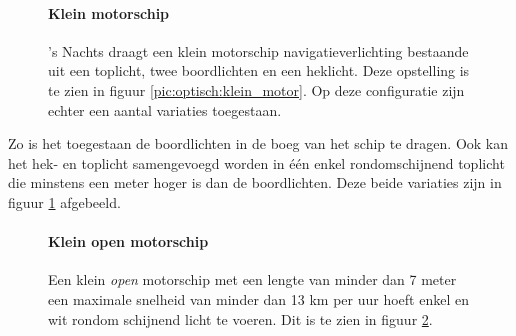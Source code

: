 \begin{figure}[H]
	\centering
	\begin{minipage}[t]{0.50\textwidth}
		\paragraph{Klein motorschip}
		's Nachts draagt een klein motorschip navigatieverlichting bestaande uit een toplicht, twee boordlichten en een heklicht. Deze opstelling is te zien in figuur \ref{pic:optisch:klein_motor}. Op deze configuratie zijn echter een aantal variaties toegestaan.		
	\end{minipage}
	\hfill
	\begin{minipage}[t]{0.22\textwidth}
		\RemoveLine
		\caption{}
		\label{pic:optisch:klein_motor}
	\end{minipage}
	\hfill
	\begin{minipage}[t]{0.22\textwidth}
		\RemoveLine
		\caption{}
		\label{pic:optisch:klein_motor2}
	\end{minipage}
\end{figure}
\vspace{-0.6cm}
Zo is het toegestaan de boordlichten in de boeg van het schip te dragen. Ook kan het hek- en toplicht samengevoegd worden in één enkel rondomschijnend toplicht die minstens een meter hoger is dan de boordlichten. Deze beide variaties zijn in figuur \ref{pic:optisch:klein_motor2} afgebeeld.


\begin{figure}[H]
	\centering
	\begin{minipage}[t]{0.75\textwidth}
		\paragraph{Klein open motorschip}
		Een klein \textit{open} motorschip met een lengte van minder dan 7 meter een maximale snelheid van minder dan 13 km per uur hoeft enkel en wit rondom schijnend licht te voeren. Dit is te zien in figuur \ref{pic:optisch:klein_openmotor}.
	\end{minipage}
	\hfill
	\begin{minipage}[t]{0.22\textwidth}
		\RemoveLine
		\caption{}
		\label{pic:optisch:klein_openmotor}
	\end{minipage}
\end{figure}


